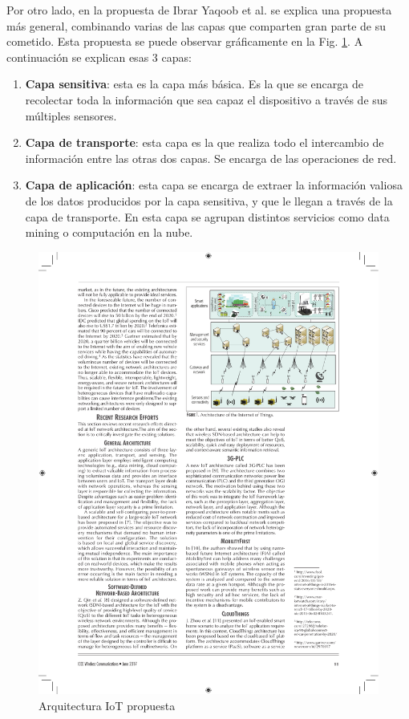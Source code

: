 Por otro lado, en la propuesta de Ibrar Yaqoob et al. \cite{yaqoob2017internet} se explica una propuesta más general, combinando varias de las capas que comparten gran parte de su cometido. Esta propuesta se puede observar gráficamente en la Fig. \ref{fig:iot_architecture}. A continuación se explican esas 3 capas:

\begin{enumerate}
    \item \textbf{Capa sensitiva}: esta es la capa más básica. Es la que se encarga de recolectar toda la información que sea capaz el dispositivo a través de sus múltiples sensores.
    \item \textbf{Capa de transporte}: esta capa es la que realiza todo el intercambio de información entre las otras dos capas. Se encarga de las operaciones de red.
    \item \textbf{Capa de aplicación}: esta capa se encarga de extraer la información valiosa de los datos producidos por la capa sensitiva, y que le llegan a través de la capa de transporte. En esta capa se agrupan distintos servicios como data mining o computación en la nube.
\end{enumerate}

\begin{figure}
    \centering
    \includegraphics{images/iot_architecture.pdf}
    \caption{Arquitectura IoT propuesta \cite{yaqoob2017internet}}
    \label{fig:iot_architecture}
\end{figure}

